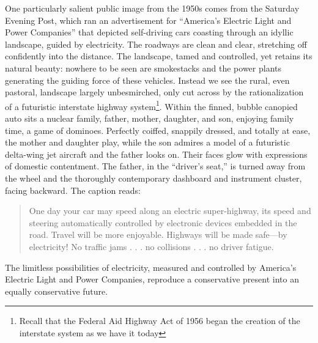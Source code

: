 One particularly salient public image from the 1950s comes from the
Saturday Evening Post, which ran an advertisement for ``America's
Electric Light and Power Companies'' that depicted self-driving cars
coasting through an idyllic landscape, guided by electricity.\cite{???} The roadways
are clean and clear, stretching off confidently into the distance. The
landscape, tamed and controlled, yet retains its natural beauty:
nowhere to be seen are smokestacks and the power plants generating the
guiding force of these vehicles. Instead we see the rural, even
pastoral, landscape largely unbesmirched, only cut across by the
rationalization of a futuristic interstate highway system\footnote{Recall that
the Federal Aid Highway Act of 1956 began the creation of the
interstate system as we have it today}. Within the finned, bubble
canopied auto sits a nuclear family, father,
mother, daughter, and son, enjoying family time, a game of dominoes.
Perfectly coiffed, snappily dressed, and totally at ease, the mother
and daughter play, while the son admires a model of a futuristic
delta-wing jet aircraft and the father looks on. Their faces glow with
expressions of domestic contentment. The father, in the ``driver's
seat,'' is turned away from the wheel and the thoroughly contemporary
dashboard and instrument cluster, facing backward. The caption reads: 
\begin{quote}
One day your car may speed along an electric super-highway, its speed
and steering automatically controlled by electronic devices embedded
in the road. Travel will be more enjoyable. Highways will be made
safe—by electricity! No traffic jams . . . no collisions . . . no
driver fatigue.\cite{???}
\end{quote}
The limitless possibilities of electricity, measured and controlled by
America's Electric Light and Power Companies, reproduce a conservative
present into an equally conservative future. 

